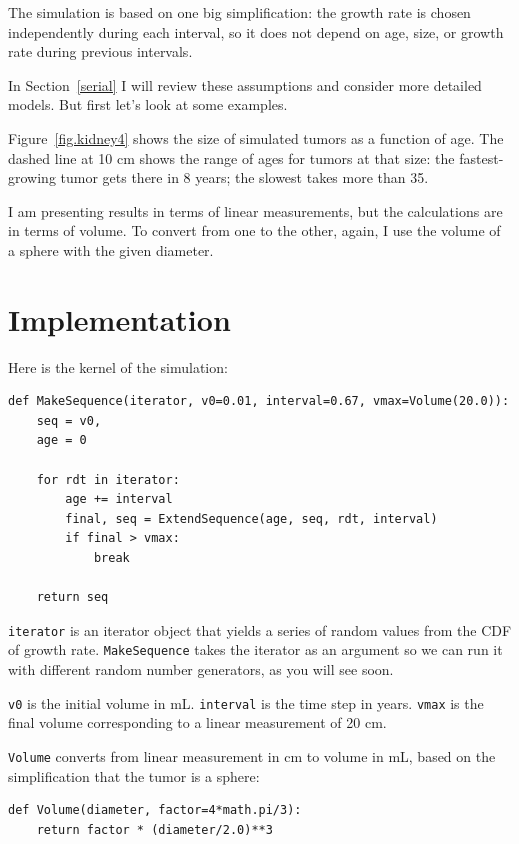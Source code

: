 \documentclass[12pt]{book}
\begin{document}
The simulation is based on one big simplification:
the growth rate is chosen independently during each interval,
so it does not depend on age, size, or growth rate during
previous intervals.

In Section~\ref{serial} I will review these assumptions and
consider more detailed models.  But first let's look at some
examples.

Figure~\ref{fig.kidney4} shows 
the size of simulated tumors as a function of
age.  The dashed line at 10 cm shows the range of ages for tumors at
that size: the fastest-growing tumor gets there in 8 years; the
slowest takes more than 35.

I am presenting results in terms of linear measurements, but the
calculations are in terms of volume.  To convert from one to the
other, again, I use the volume of a sphere with the given
diameter.


\section{Implementation}

Here is the kernel of the simulation:

\begin{verbatim}
def MakeSequence(iterator, v0=0.01, interval=0.67, vmax=Volume(20.0)):
    seq = v0,
    age = 0

    for rdt in iterator:
        age += interval
        final, seq = ExtendSequence(age, seq, rdt, interval)
        if final > vmax:
            break

    return seq
\end{verbatim}

{\tt iterator} is an iterator object that yields a series of
random values from the CDF of growth rate.  {\tt MakeSequence}
takes the iterator as an argument so we can run it with
different random number generators, as you will see soon.

{\tt v0} is the initial volume in mL.  {\tt interval} is the time step
in years.  {\tt vmax} is the final volume corresponding to a linear
measurement of 20 cm.

{\tt Volume} converts from linear measurement in cm to volume
in mL, based on the simplification that the tumor is a sphere:

\begin{verbatim}
def Volume(diameter, factor=4*math.pi/3):
    return factor * (diameter/2.0)**3
\end{verbatim}
\end{document}
